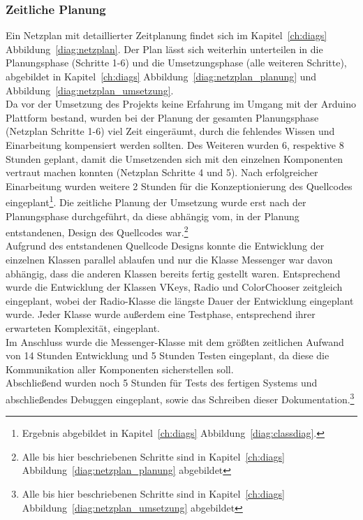 \documentclass[a4paper, 11pt]{scrartcl}
\begin{document}
\subsubsection{Zeitliche Planung}
Ein Netzplan mit detaillierter Zeitplanung findet sich im Kapitel~\ref{ch:diags} Abbildung~\ref{diag:netzplan}. Der Plan lässt sich weiterhin unterteilen in die
Planungsphase (Schritte 1-6) und die Umsetzungsphase (alle weiteren Schritte), abgebildet in Kapitel~\ref{ch:diags} Abbildung~\ref{diag:netzplan_planung} 
und Abbildung~\ref{diag:netzplan_umsetzung}.
\\
Da vor der Umsetzung des Projekts keine Erfahrung im Umgang mit der Arduino Plattform bestand, wurden bei der Planung der gesamten Planungsphase (Netzplan Schritte 1-6) 
viel Zeit eingeräumt, durch die fehlendes Wissen und Einarbeitung kompensiert werden sollten. Des Weiteren wurden 6, respektive 8 Stunden geplant, damit die 
Umsetzenden sich mit den einzelnen Komponenten vertraut machen konnten (Netzplan Schritte 4 und 5). Nach erfolgreicher Einarbeitung wurden weitere 2 Stunden
für die Konzeptionierung des Quellcodes eingeplant\footnote{Ergebnis abgebildet in Kapitel~\ref{ch:diags} Abbildung~\ref{diag:classdiag}.}. Die zeitliche 
Planung der Umsetzung wurde erst nach der Planungsphase durchgeführt, da diese abhängig vom, in der Planung entstandenen, Design des Quellcodes war.\footnote{Alle bis hier 
beschriebenen Schritte sind in Kapitel~\ref{ch:diags} Abbildung~\ref{diag:netzplan_planung} abgebildet}
\\
Aufgrund des entstandenen Quellcode Designs konnte die Entwicklung der einzelnen Klassen parallel ablaufen und nur die Klasse \glqq Messenger\grqq{} war davon abhängig,
dass die anderen Klassen bereits fertig gestellt waren. Entsprechend wurde die Entwicklung der Klassen \glqq VKeys\grqq , \glqq Radio\grqq{} und \glqq ColorChooser\grqq{}
zeitgleich eingeplant, wobei der Radio-Klasse die längste Dauer der Entwicklung eingeplant wurde. Jeder Klasse wurde außerdem eine Testphase, entsprechend ihrer erwarteten
Komplexität, eingeplant.
\\
Im Anschluss wurde die Messenger-Klasse mit dem größten zeitlichen Aufwand von 14 Stunden Entwicklung und 5 Stunden Testen eingeplant, da diese die Kommunikation
aller Komponenten sicherstellen soll.
\\
Abschließend wurden noch 5 Stunden für Tests des fertigen Systems und abschließendes Debuggen eingeplant, sowie das Schreiben dieser Dokumentation.\footnote{Alle bis hier 
beschriebenen Schritte sind in Kapitel~\ref{ch:diags} Abbildung~\ref{diag:netzplan_umsetzung} abgebildet}
\end{document}
